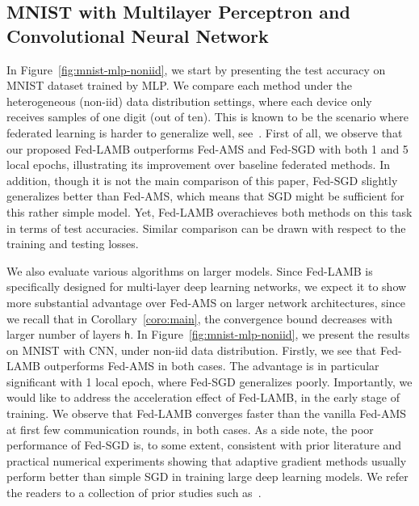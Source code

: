 \documentclass[11pt]{article}
\def\tot{\mathsf{h}}
\begin{document}
\vspace{0.05in}
\subsection{MNIST with Multilayer Perceptron and Convolutional Neural Network}

In Figure~\ref{fig:mnist-mlp-noniid}, we start by presenting the test accuracy on MNIST dataset trained by MLP. 
We compare each method under the heterogeneous (non-iid) data distribution settings, where each device only receives samples of one digit (out of ten). 
This is known to be the scenario where federated learning is harder to generalize well, see~\cite{mcmahan2017communication}. 
First of all, we observe that our proposed Fed-LAMB outperforms Fed-AMS and Fed-SGD with both 1 and 5 local epochs, illustrating its improvement over baseline federated methods. 
In addition, though it is not the main comparison of this paper, Fed-SGD slightly generalizes better than Fed-AMS, which means that SGD might be sufficient for this rather simple model. 
Yet, Fed-LAMB overachieves both methods on this task in terms of test accuracies.
Similar comparison can be drawn with respect to the training and testing losses.



We also evaluate various algorithms on larger models. 
Since Fed-LAMB is specifically designed for multi-layer deep learning networks, we expect it to show more substantial advantage over Fed-AMS on larger network architectures, since we recall that in Corollary~\ref{coro:main}, the convergence bound decreases with larger number of layers $\tot$.
In Figure~\ref{fig:mnist-mlp-noniid}, we present the results on MNIST with CNN, under non-iid data distribution. Firstly, we see that Fed-LAMB outperforms Fed-AMS in both cases. The advantage is in particular significant with 1 local epoch, where Fed-SGD generalizes poorly. Importantly, we would like to address the acceleration effect of Fed-LAMB, in the early stage of training. We observe that Fed-LAMB converges faster than the vanilla Fed-AMS at first few communication rounds, in both cases. 
As a side note, the poor performance of Fed-SGD is, to some extent, consistent with prior literature and practical numerical experiments showing that adaptive gradient methods usually perform better than simple SGD in training large deep learning models. We refer the readers to a collection of prior studies such as~\cite{chen2020toward,reddi2020adaptive}. 
\end{document}
